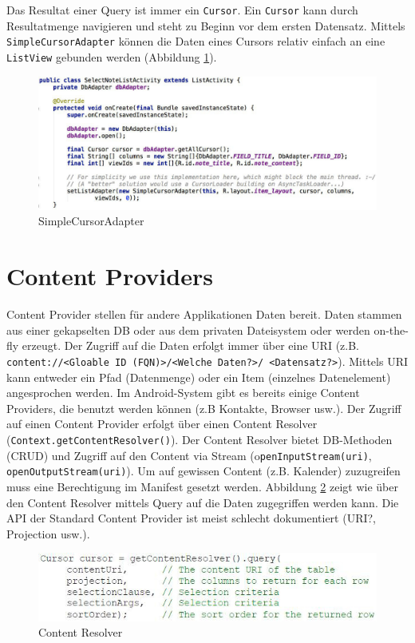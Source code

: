 Das Resultat einer Query ist immer ein \texttt{Cursor}. Ein \texttt{Cursor} kann durch Resultatmenge navigieren und steht zu Beginn vor dem ersten Datensatz. Mittels \texttt{SimpleCursorAdapter} können die Daten eines Cursors relativ einfach an eine \texttt{ListView} gebunden werden (Abbildung \ref{fig:simple-cursor-adapter}).
\begin{figure}
\centering
\includegraphics[width=\linewidth]{fig/simple-cursor-adapter}
\caption{SimpleCursorAdapter}
\label{fig:simple-cursor-adapter}
\end{figure}

\section{Content Providers}

Content Provider stellen für andere Applikationen Daten bereit. Daten stammen aus einer gekapselten DB oder aus dem privaten Dateisystem oder werden on-the-fly erzeugt. Der Zugriff auf die Daten erfolgt immer über eine URI (z.B. \texttt{content://<Gloable ID (FQN)>/<Welche Daten?>/ \allowbreak <Datensatz?>}). Mittels URI kann entweder ein Pfad (Datenmenge) oder ein Item (einzelnes Datenelement) angesprochen werden. Im Android-System gibt es bereits einige Content Providers, die benutzt werden können (z.B Kontakte, Browser usw.). Der Zugriff auf einen Content Provider erfolgt über einen Content Resolver (\texttt{Context.getContentResolver()}). Der Content Resolver bietet DB-Methoden (CRUD) und Zugriff auf den Content via Stream (o\texttt{penInputStream(uri)}, \texttt{openOutputStream(uri)}). Um auf gewissen Content (z.B. Kalender) zuzugreifen muss eine Berechtigung im Manifest gesetzt werden. Abbildung \ref{fig:content-resolver} zeigt wie über den Content Resolver mittels Query auf die Daten zugegriffen werden kann. Die API der Standard Content Provider ist meist schlecht dokumentiert (URI?, Projection usw.). 

\begin{figure}
\centering
\includegraphics[width=0.7\linewidth]{fig/content-resolver}
\caption{Content Resolver}
\label{fig:content-resolver}
\end{figure}


